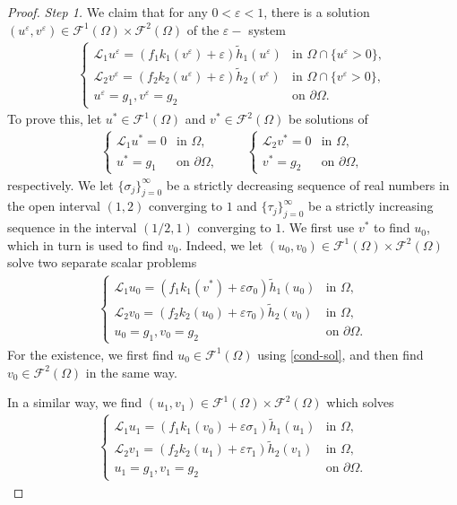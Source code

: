 \documentclass[11pt,oneside,english]{amsart}
\newcommand{\cL}{{\mathcal L}}
\newcommand{\cF}{{\mathcal F}}
\newcommand{\e}{\varepsilon}
\numberwithin{equation}{section}
\theoremstyle{plain}
\numberwithin{equation}{section}
\begin{document}
\begin{proof}
\medskip\noindent\emph{Step 1.}
We claim that for any $0<\e<1$, there is  a solution $(u^\e,v^\e)\in \cF^1(\Omega)\times \cF^2(\Omega)$ of the $\e-$
system
\begin{align}
    \label{eq:sol-eps}
    \begin{cases}
        \cL_1 u^\e=(f_1k_1(v^\e)+\e)\tilde h_1(u^\e)&\text{in }\Omega\cap\{u^\e>0\},\\
            \cL_2 v^\e=(f_2k_2(u^\e)+\e)\tilde h_2(v^\e)&\text{in }\Omega\cap\{v^\e>0\},\\
            u^\e=g_1, v^\e=g_2&\text{on }\partial\Omega.
    \end{cases}
\end{align}
To prove this, let $u^*\in \cF^1(\Omega)$ and $v^*\in \cF^2(\Omega)$ be solutions of
\begin{align}\label{eq:sol-hom}
    \begin{cases}
        \cL_1u^*=0&\text{in }\Omega,\\
        u^*=g_1&\text{on }\partial\Omega,
    \end{cases}
    \qquad \begin{cases}
        \cL_2v^*=0&\text{in }\Omega,\\
        v^*=g_2&\text{on }\partial\Omega,
    \end{cases}
\end{align}
respectively. 
We let $\{\sigma_j\}_{j=0}^\infty$ be a strictly decreasing sequence of real numbers in the open interval $(1,2)$ converging to $1$ and $\{\tau_j\}_{j=0}^\infty$ be a strictly increasing sequence in the interval $(1/2,1)$ converging to $1$. We first use $v^*$ to find  $u_0$, which in turn is used to find $v_0$.
 Indeed, we let  $(u_0,v_0)\in \cF^1(\Omega)\times \cF^2(\Omega)$ solve  two separate  scalar problems
\begin{align*}
    \begin{cases}
        \cL_1 u_0=(f_1k_1(v^*)+\e \sigma_0)\tilde h_1(u_0)&\text{in }\Omega,\\
        \cL_2 v_0=(f_2k_2(u_0)+\e \tau_0)\tilde h_2(v_0)&\text{in }\Omega,\\
        u_0=g_1,v_0=g_2&\text{on }\partial\Omega.
    \end{cases}
\end{align*}
For the existence, we first find $u_0\in \cF^1(\Omega)$ using \ref{cond-sol}, and then find $v_0\in \cF^2(\Omega)$ in the same way.

In a similar way, we find $(u_1,v_1)\in \cF^1(\Omega)\times \cF^2(\Omega)$ which solves
\begin{align*}
    \begin{cases}
        \cL_1 u_1=(f_1k_1(v_0)+\e \sigma_1)\tilde h_1(u_1) &\text{in }\Omega,\\
        \cL_2 v_1=(f_2k_2(u_1)+\e \tau_1)\tilde h_2(v_1) &\text{in }\Omega,\\
        u_1=g_1,v_1=g_2&\text{on }\partial\Omega.
    \end{cases}
\end{align*}


\end{proof}
\end{document}

